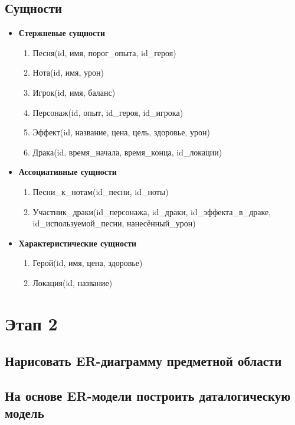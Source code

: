 \subsection*{Сущности}


\begin{itemize}
\item \textbf{Стержневые сущности}
\begin{enumerate}
    \item Песня(id, имя, порог\_опыта, id\_героя)
    \item Нота(id, имя, урон)
    \item Игрок(id, имя, баланс)
    \item Персонаж(id, опыт, id\_героя, id\_игрока)
    \item Эффект(id, название, цена, цель, здоровье, урон)
    \item Драка(id, время\_начала, время\_конца, id\_локации)
\end{enumerate}

\item \textbf{Ассоциативные сущности}
\begin{enumerate}
    \item Песни\_к\_нотам(id\_песни, id\_ноты)
    \item Участник\_драки(id\_персонажа, id\_драки, id\_эффекта\_в\_драке, id\_используемой\_песни, нанесённый\_урон)
\end{enumerate}

\item \textbf{Характеристические сущности}
\begin{enumerate}
    \item Герой(id, имя, цена, здоровье)
    \item Локация(id, название)
\end{enumerate}
\end{itemize}

\section*{Этап 2}


\subsection*{Нарисовать ER-диаграмму предметной области}



\subsection*{На основе ER-модели построить даталогическую модель}


